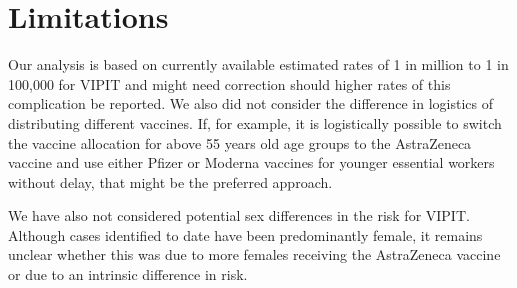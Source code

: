 \documentclass[]{interact}
\theoremstyle{plain}%
\theoremstyle{definition}
\theoremstyle{remark}
\begin{document}
\hypertarget{limitations}{%
\section{Limitations}\label{limitations}}

Our analysis is based on currently available estimated rates of 1 in
million to 1 in 100,000 for VIPIT and might need correction should
higher rates of this complication be reported. We also did not consider
the difference in logistics of distributing different vaccines. If, for
example, it is logistically possible to switch the vaccine allocation
for above 55 years old age groups to the AstraZeneca vaccine and use
either Pfizer or Moderna vaccines for younger essential workers without
delay, that might be the preferred approach.

We have also not considered potential sex differences in the risk for
VIPIT. Although cases identified to date have been predominantly female,
it remains unclear whether this was due to more females receiving the
AstraZeneca vaccine or due to an intrinsic difference in risk.



\end{document}
